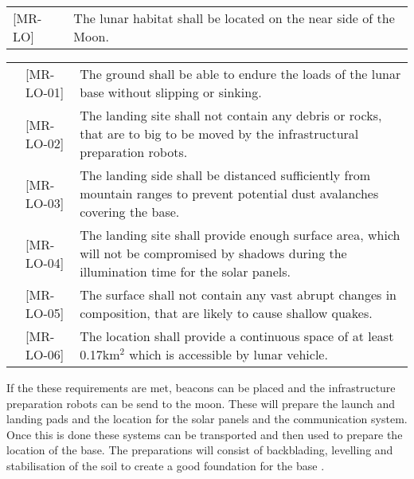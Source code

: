 \begin{tabular}{L{2.5cm} L{15cm}}

{[}MR-LO{]} & The lunar habitat shall be located on the near side of the Moon.\\

\end{tabular}



\begin{tabular}{L{0.32cm}lp{11.5cm}}

& {[}MR-LO-01{]} & The ground shall be able to endure the loads of the lunar base without slipping or sinking.\\

& {[}MR-LO-02{]} & The landing site shall not contain any debris or rocks, that are to big to be moved by the infrastructural preparation robots.\\

& {[}MR-LO-03{]} & The landing side shall be distanced sufficiently from mountain ranges to prevent potential dust avalanches covering the base.\\

& {[}MR-LO-04{]} & The landing site shall provide enough surface area, which will not be compromised by shadows during the illumination time for the solar panels.\\

& {[}MR-LO-05{]} & The surface shall not contain any vast abrupt changes in composition, that are likely to cause shallow quakes. \\

& {[}MR-LO-06{]} & The location shall provide a continuous space of at least 0.17km$^2$ which is accessible by lunar vehicle.\\

\end{tabular}

\newline



If the these requirements are met, beacons can be placed and the infrastructure preparation robots can be send to the moon. These will prepare the launch and landing pads and the location for the solar panels and the communication system. Once this is done these systems can be transported and then used to prepare the location of the base. The preparations will consist of backblading, levelling and stabilisation of the soil to create a good foundation for the base \cite{NexGen}.\\



